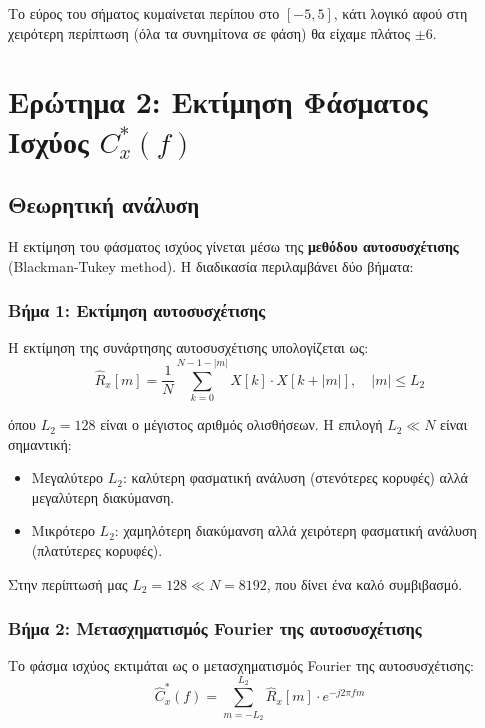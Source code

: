 \documentclass[a4paper,12pt]{article}
\begin{document}
Το εύρος του σήματος κυμαίνεται περίπου στο $[-5, 5]$, κάτι λογικό αφού στη χειρότερη περίπτωση (όλα τα συνημίτονα σε φάση) θα είχαμε πλάτος $\pm 6$.

\newpage
\section{Ερώτημα 2: Εκτίμηση Φάσματος Ισχύος $C_x^*(f)$}

\subsection{Θεωρητική ανάλυση}

Η εκτίμηση του φάσματος ισχύος γίνεται μέσω της \textbf{μεθόδου αυτοσυσχέτισης} (Blackman-Tukey method). Η διαδικασία περιλαμβάνει δύο βήματα:

\subsubsection{Βήμα 1: Εκτίμηση αυτοσυσχέτισης}

Η εκτίμηση της συνάρτησης αυτοσυσχέτισης υπολογίζεται ως:
\begin{equation}
    \hat{R}_x[m] = \frac{1}{N} \sum_{k=0}^{N-1-|m|} X[k] \cdot X[k + |m|], \quad |m| \leq L_2
    \label{eq:autocorrelation}
\end{equation}

όπου $L_2 = 128$ είναι ο μέγιστος αριθμός ολισθήσεων. Η επιλογή $L_2 \ll N$ είναι σημαντική:
\begin{itemize}
    \item Μεγαλύτερο $L_2$: καλύτερη φασματική ανάλυση (στενότερες κορυφές) αλλά μεγαλύτερη διακύμανση.
    \item Μικρότερο $L_2$: χαμηλότερη διακύμανση αλλά χειρότερη φασματική ανάλυση (πλατύτερες κορυφές).
\end{itemize}

Στην περίπτωσή μας $L_2 = 128 \ll N = 8192$, που δίνει ένα καλό συμβιβασμό.

\subsubsection{Βήμα 2: Μετασχηματισμός Fourier της αυτοσυσχέτισης}

Το φάσμα ισχύος εκτιμάται ως ο μετασχηματισμός Fourier της αυτοσυσχέτισης:
\begin{equation}
    \hat{C}_x^*(f) = \sum_{m=-L_2}^{L_2} \hat{R}_x[m] \cdot e^{-j2\pi f m}
    \label{eq:power_spectrum}
\end{equation}
\end{document}
